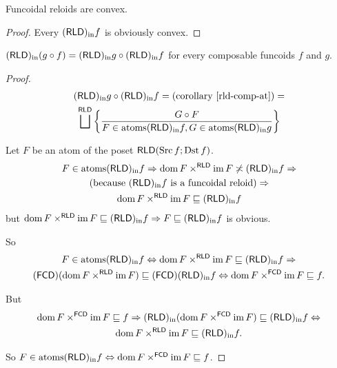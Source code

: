 \begin{cor}
Funcoidal reloids are convex.\end{cor}
\begin{proof}
Every $(\mathsf{RLD})_{\mathrm{in}} f$ is obviously convex.\end{proof}
\begin{thm}\label{rldin-dist}
$(\mathsf{RLD})_{\mathrm{in}}(g\circ f)=(\mathsf{RLD})_{\mathrm{in}} g\circ(\mathsf{RLD})_{\mathrm{in}} f$ for every composable
funcoids $f$ and $g$.\end{thm}
\begin{proof}
~
\begin{multline*}
\torldin g\circ\torldin f=\text{(corollary \ref{rld-comp-at})}=\\
\bigsqcup^{\mathsf{RLD}}\setcond{G\circ F}{F\in\atoms\torldin f,G\in\atoms\torldin g}
\end{multline*}


Let $F$ be an atom of the poset $\mathsf{RLD}(\operatorname{Src} f;\operatorname{Dst} f)$.
\begin{multline*}
F\in\operatorname{atoms}(\mathsf{RLD})_{\mathrm{in}} f\Rightarrow\operatorname{dom} F\times^{\mathsf{RLD}}\operatorname{im} F\not\asymp(\mathsf{RLD})_{\mathrm{in}} f\Rightarrow\\
\text{(because \ensuremath{(\mathsf{RLD})_{\mathrm{in}} f} is a funcoidal reloid)}\Rightarrow\\
\operatorname{dom} F\times^{\mathsf{RLD}}\operatorname{im} F\sqsubseteq(\mathsf{RLD})_{\mathrm{in}} f
\end{multline*}
but $\operatorname{dom} F\times^{\mathsf{RLD}}\operatorname{im} F\sqsubseteq(\mathsf{RLD})_{\mathrm{in}} f\Rightarrow F\sqsubseteq(\mathsf{RLD})_{\mathrm{in}} f$
is obvious.

So 
\begin{multline*}
F\in\operatorname{atoms}(\mathsf{RLD})_{\mathrm{in}} f\Leftrightarrow\operatorname{dom} F\times^{\mathsf{RLD}}\operatorname{im} F\sqsubseteq(\mathsf{RLD})_{\mathrm{in}} f\Rightarrow\\
(\mathsf{FCD})(\operatorname{dom} F\times^{\mathsf{RLD}}\operatorname{im} F)\sqsubseteq(\mathsf{FCD})(\mathsf{RLD})_{\mathrm{in}} f\Leftrightarrow\operatorname{dom} F\times^{\mathsf{FCD}}\operatorname{im} F\sqsubseteq f.
\end{multline*}


But 
\begin{multline*}
\operatorname{dom} F\times^{\mathsf{FCD}}\operatorname{im} F\sqsubseteq f\Rightarrow(\mathsf{RLD})_{\mathrm{in}}(\operatorname{dom} F\times^{\mathsf{FCD}}\operatorname{im} F)\sqsubseteq(\mathsf{RLD})_{\mathrm{in}} f\Leftrightarrow\\
\operatorname{dom} F\times^{\mathsf{RLD}}\operatorname{im} F\sqsubseteq(\mathsf{RLD})_{\mathrm{in}} f.
\end{multline*}


So $F\in\operatorname{atoms}(\mathsf{RLD})_{\mathrm{in}} f\Leftrightarrow\operatorname{dom} F\times^{\mathsf{FCD}}\operatorname{im} F\sqsubseteq f$.


\end{proof}
